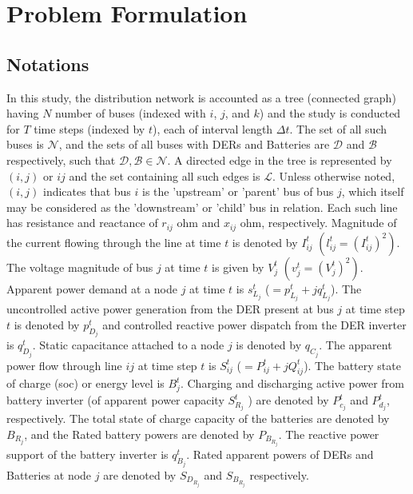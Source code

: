 \documentclass[../../outputs/main.tex]{subfiles}
\begin{document}
\section{Problem Formulation}

\subsection{Notations}
In this study, the distribution network is accounted as a tree (connected graph) having \(N\) number of buses (indexed with \(i\), \(j\), and \(k\)) and the study is conducted for \(T\) time steps (indexed by \(t\)), each of interval length $\Delta t$. The set of all such buses is $\mathcal{N}$, and the sets of all buses with DERs and Batteries are $\mathcal{D}$ and $\mathcal{B}$ respectively, such that $\mathcal{D}, \mathcal{B} \in \mathcal{N}$. A directed edge in the tree is represented by $(i, j)$ or $ij$ and the set containing all such edges is $\mathcal{L}$. Unless otherwise noted, $(i, j)$ indicates that bus $i$ is the 'upstream' or 'parent' bus of bus $j$, which itself may be considered as the 'downstream' or 'child' bus in relation. Each such line has resistance and reactance of \(r_{ij}\) ohm and \(x_{ij}\) ohm, respectively. Magnitude of the current flowing through the line at time \(t\) is denoted by \(I_{ij}^t\) $\left(l_{ij}^t=\left(I_{ij}^t\right)^2\right)$. The voltage magnitude of bus \(j\) at time \(t\) is given by \(V_j^t\) $\left(v_j^t=\left(V_j^t\right)^2\right)$. Apparent power demand at a node \(j\) at time \(t\) is \(s^t_{L_j}\) (\(=p^t_{L_j}+\textit{j}q^t_{L_j}\)). The uncontrolled active power generation from the DER present at bus \(j\) at time step \(t\) is denoted by \(p^t_{D_j}\) and controlled reactive power dispatch from the DER inverter is \(q^t_{D_j}\). Static capacitance attached to a node $j$ is denoted by $q_{C_j}$. The apparent power flow through line {\(ij\)} at time step \(t\) is \(S_{ij}^t\) (\(=P_{ij}^t+\textit{j}Q_{ij}^t\)). The battery state of charge (soc) or energy level is \(B_j^t\). Charging and discharging active power from battery inverter (of apparent power capacity \(S^{t}_{R_j}\) ) are denoted by \(P_{c_j}^t\) and \(P_{d_j}^t\), respectively. The total state of charge capacity of the batteries are denoted by $B_{R_j}$, and the Rated battery powers are denoted by $P_{B_{R_j}}$. The reactive power support of the battery inverter is \(q_{B_j}^t\). Rated apparent powers of DERs and Batteries at node $j$ are denoted by $S_{D_{R_j}}$ and $S_{B_{R_j}}$ respectively.
\end{document}
